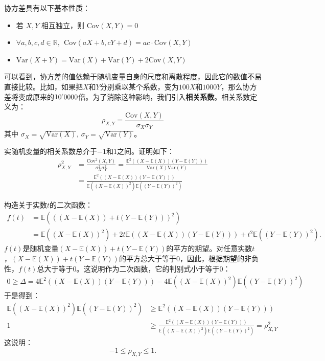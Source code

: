 \documentclass[12pt,UTF8]{ctexbook}
\begin{document}
协方差具有以下基本性质：
\begin{itemize}
    \item 若 \(X,Y\) 相互独立，则 \(\text{Cov}(X,Y) = 0\)
    \item \(\forall a,b,c,d \in \mathbb{R}, \;\,\text{Cov}(aX+b,cY+d) = ac\cdot\text{Cov}(X,Y)\)
    \item \(\text{Var}(X+Y) = \text{Var}(X) + \text{Var}(Y) + 2\text{Cov}(X,Y)\)
\end{itemize}

可以看到，协方差的值依赖于随机变量自身的尺度和离散程度，因此它的数值不易直接比较。比如，如果把$X$和$Y$分别乘以某个系数，变为$100X$和$1000Y$，那么协方差将变成原来的$10\dlim{0000}$倍。为了消除这种影响，我们引入\textbf{相关系数}。相关系数定义为：
\[
\rho_{X,Y} = \frac{\text{Cov}(X,Y)}{\sigma_X \sigma_Y}
\]
其中 \(\sigma_X = \sqrt{\text{Var}(X)}\), \(\sigma_Y = \sqrt{\text{Var}(Y)}\)。

实随机变量的相关系数总介于$-1$和$1$之间。证明如下：
\begin{align*}
    \rho^2_{X,Y} &= \frac{\text{Cov}^2(X,Y)}{\sigma_X^2 \sigma_Y^2} = \frac{\mathbb{E}^2((X - \mathbb{E}(X))(Y - \mathbb{E}(Y)))}{\text{Var}(X)\text{Var}(Y)} \\[2ex]
    &= \frac{\mathbb{E}^2((X - \mathbb{E}(X))(Y - \mathbb{E}(Y)))}{\mathbb{E}((X - \mathbb{E}(X))^2)\mathbb{E}((Y - \mathbb{E}(Y))^2)} 
\end{align*}

构造关于实数$t$的二次函数：
\begin{align*}
    f(t) &= \mathbb{E}(((X - \mathbb{E}(X)) + t(Y - \mathbb{E}(Y)))^2) \\
    &= \mathbb{E}((X - \mathbb{E}(X))^2) + 2t\mathbb{E}((X - \mathbb{E}(X))(Y - \mathbb{E}(Y))) + t^2\mathbb{E}((Y - \mathbb{E}(Y))^2).
\end{align*}
$f(t)$是随机变量$(X - \mathbb{E}(X)) + t(Y - \mathbb{E}(Y))$的平方的期望。对任意实数$t$，$(X - \mathbb{E}(X)) + t(Y - \mathbb{E}(Y))$的平方总大于等于$0$，因此，根据期望的非负性，$f(t)$总大于等于$0$。这说明作为二次函数，它的判别式小于等于$0$：
\begin{align*}
    0 \geqslant 
    \Delta = 4\mathbb{E}^2((X - \mathbb{E}(X))(Y - \mathbb{E}(Y))) - 4\mathbb{E}((X - \mathbb{E}(X))^2)\mathbb{E}((Y - \mathbb{E}(Y))^2) 
\end{align*}
于是得到：
\begin{align*}
    \mathbb{E}((X - \mathbb{E}(X))^2)\mathbb{E}((Y - \mathbb{E}(Y))^2) &\geqslant \mathbb{E}^2((X - \mathbb{E}(X))(Y - \mathbb{E}(Y))) \\[2ex]
    1 &\geqslant \frac{\mathbb{E}^2((X - \mathbb{E}(X))(Y - \mathbb{E}(Y)))}{\mathbb{E}((X - \mathbb{E}(X))^2)\mathbb{E}((Y - \mathbb{E}(Y))^2)} = \rho^2_{X,Y} 
\end{align*}
这说明：
$$ -1 \leqslant \rho_{X,Y} \leqslant 1.$$
\end{document}
